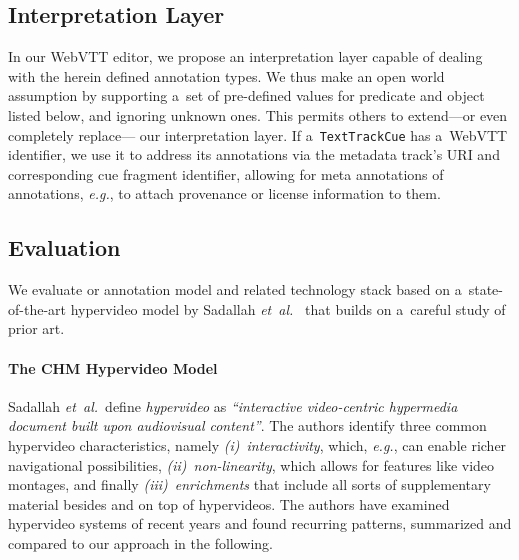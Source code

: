 \documentclass{sig-alternate}
\begin{document}
\subsection{Interpretation Layer}

In our WebVTT editor,
we propose an interpretation layer
capable of dealing with the herein defined annotation types. 
We thus make an open world assumption
by supporting a~set of pre-defined values for predicate and object
listed below, and ignoring unknown ones.
This permits others to extend---or even completely replace---%
our interpretation layer.
If a~\texttt{TextTrackCue} has a~WebVTT identifier,
we use it to address its annotations
via the metadata track's URI
and corresponding cue fragment identifier,
allowing for meta annotations of annotations, \emph{e.g.},
to attach provenance or license information to them.

\subsection{Evaluation}

We evaluate or annotation model and related technology stack
based on a~state-of-the-art hypervideo model by
Sadallah \emph{et~al.}~\cite{sadallah2012hypervideo}
that builds on a~careful study of prior art.

\paragraph{The CHM Hypervideo Model}

Sadallah \emph{et~al.}\ define
\emph{hypervideo} as \textit{``interactive video-centric
hypermedia document built upon audiovisual content''}.
The authors identify three common hypervideo characteristics,\linebreak
namely \emph{(i)}~\emph{interactivity}, which, \emph{e.g.},
can enable richer navigational possibilities,
\emph{(ii)}~\emph{non-linearity}, which allows for features
like video montages, and finally \emph{(iii)}~\emph{enrichments}
that include all sorts of supplementary material besides
and on top of hypervideos.
The authors have examined hypervideo systems
of recent years and found recurring patterns,
summarized and compared to our approach
in the following.\\
\end{document}
